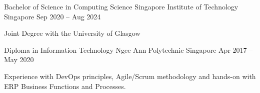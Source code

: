 

\begin{cventries}

  \cventry
  {Bachelor of Science in Computing Science} %
  {Singapore Institute of Technology} %
  {Singapore} %
  {Sep 2020 – Aug 2024} %
  {
    \begin{cvitems} %
      \item {Joint Degree with the University of Glasgow}\vspace{5mm}
    \end{cvitems}
  }

  \cventry
  {Diploma in Information Technology} %
  {Ngee Ann Polytechnic} %
  {Singapore} %
  {Apr 2017 – May 2020} %
  {
    \begin{cvitems} %
      \item {Experience with DevOps principles, Agile/Scrum methodology and hands-on with ERP Business Functions and Processes. }\vspace{5mm}
    \end{cvitems}
  }

\end{cventries}